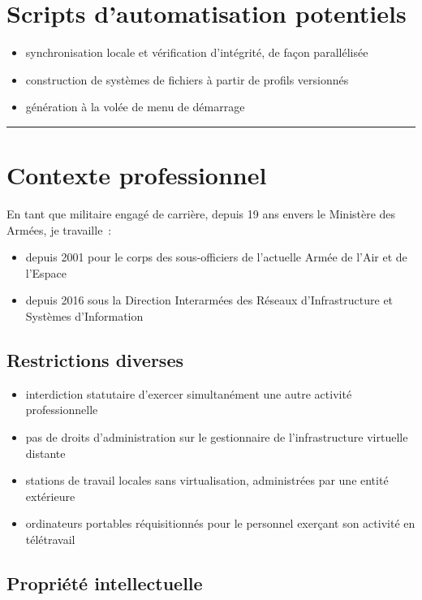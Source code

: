 \documentclass[10pt]{article}
\newcommand{\hr}{\rule{\textwidth}{1pt}}
\newenvironment{itmz}{\begin{itemize}
\setlength{\itemsep}{0em}
}{\end{itemize}}
\begin{document}
\section{Scripts d’automatisation potentiels}

\begin{itmz}
\item{synchronisation locale et vérification d’intégrité, de façon parallélisée}
\item{construction de systèmes de fichiers à partir de profils versionnés}
\item{génération à la volée de menu de démarrage}
\end{itmz}

\hr

\appendix

\section{Contexte professionnel}

En tant que militaire engagé de carrière, depuis 19 ans envers le Ministère des Armées, je travaille :
\begin{itmz}
\item{depuis 2001 pour le corps des sous-officiers de l’actuelle Armée de l’Air et de l’Espace}
\item{depuis 2016 sous la Direction Interarmées des Réseaux d’Infrastructure et Systèmes d’Information}
\end{itmz}

\subsection{Restrictions diverses}

\begin{itmz}
\item{interdiction statutaire d’exercer simultanément une autre activité professionnelle}
\item{pas de droits d’administration sur le gestionnaire de l’infrastructure virtuelle distante}
\item{stations de travail locales sans virtualisation, administrées par une entité extérieure}
\item{ordinateurs portables réquisitionnés pour le personnel exerçant son activité en télétravail}
\end{itmz}

\subsection{Propriété intellectuelle}
\end{document}
